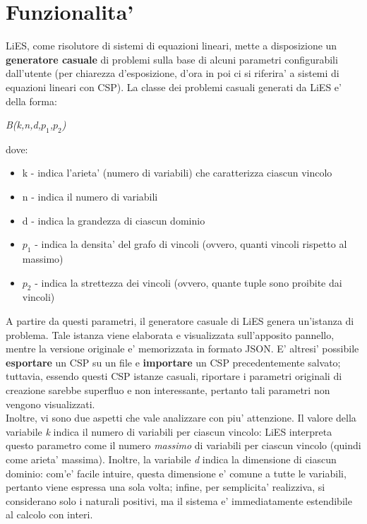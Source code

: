 \documentclass{article}
\begin{document}
\section{Funzionalita'}
\label{sec:funzionalita}

LiES, come risolutore di sistemi di equazioni lineari, mette a disposizione un \textbf{generatore casuale} di problemi sulla base di alcuni parametri configurabili dall'utente (per chiarezza d'esposizione, d'ora in poi ci si riferira' a sistemi di equazioni lineari con CSP). La classe dei problemi casuali generati da LiES e' della forma:
\begin{center}
	\textit{B(k,n,d,$p_1$,$p_2$)}
\end{center}

dove:
\begin{itemize}
	\item k - indica l'arieta' (numero di variabili) che caratterizza ciascun vincolo
	\item n - indica il numero di variabili
	\item d - indica la grandezza di ciascun dominio
	\item $p_1$ - indica la densita' del grafo di vincoli (ovvero, quanti vincoli rispetto al massimo)
	\item $p_2$ - indica la strettezza dei vincoli (ovvero,	quante tuple sono proibite dai vincoli) 
\end{itemize}

A partire da questi parametri, il generatore casuale di LiES genera un'istanza di problema. Tale istanza viene elaborata e visualizzata sull'apposito pannello, mentre la versione originale e' memorizzata in formato JSON. E' altresi' possibile \textbf{esportare} un CSP su un file e \textbf{importare} un CSP precedentemente salvato; tuttavia, essendo questi CSP istanze casuali, riportare i parametri originali di creazione sarebbe superfluo e non interessante, pertanto tali parametri non vengono visualizzati.\\

Inoltre, vi sono due aspetti che vale analizzare con piu' attenzione. Il valore della variabile \textit{k} indica il numero di variabili per ciascun vincolo: LiES interpreta questo parametro come il numero \textit{massimo} di variabili per ciascun vincolo (quindi come arieta' massima). Inoltre, la variabile \textit{d} indica la dimensione di ciascun dominio: com'e' facile intuire, questa dimensione e' comune a tutte le variabili, pertanto viene espressa una sola volta; infine, per semplicita' realizziva, si considerano solo i naturali positivi, ma il sistema e' immediatamente estendibile al calcolo con interi.\\
\end{document}
